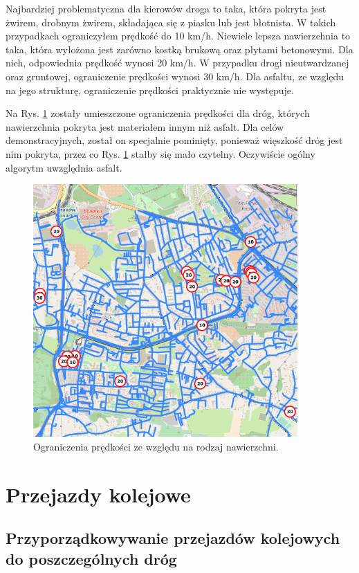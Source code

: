 Najbardziej problematyczna dla kierowów droga to taka, która pokryta jest żwirem, drobnym żwirem, składająca się z piasku lub jest błotnista. W takich przypadkach ograniczyłem prędkość do 10 km/h. Niewiele lepsza nawierzchnia to taka, która wyłożona jest zarówno kostką brukową oraz płytami betonowymi. Dla nich, odpowiednia prędkość wynosi 20 km/h. W przypadku drogi nieutwardzanej oraz gruntowej, ograniczenie prędkości wynosi 30 km/h. Dla asfaltu, ze względu na jego strukturę, ograniczenie prędkości praktycznie nie występuje. 

Na Rys. \ref{sec:surfaceTypePhoto} zostały umieszczone ograniczenia prędkości dla dróg, których nawierzchnia pokryta jest materiałem innym niż asfalt. Dla celów demonstracyjnych, został on specjalnie pominięty, ponieważ więszkość dróg jest nim pokryta, przez co Rys. \ref{sec:surfaceTypePhoto} stałby się mało czytelny. Oczywiście ogólny algorytm uwzględnia asfalt.

\newpage
\begin{figure}[h]
\caption{Ograniczenia prędkości ze względu na rodzaj nawierzchni.}
\label{sec:surfaceTypePhoto}
\centering
\includegraphics[width=0.9\textwidth]{surfaceType}
\end{figure}

\newpage
\section{Przejazdy kolejowe}
\subsection{Przyporządkowywanie przejazdów kolejowych do poszczególnych dróg}

